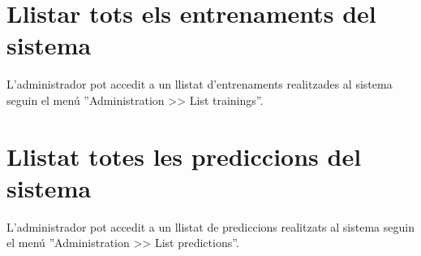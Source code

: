\section{Llistar tots els entrenaments del sistema}
L'administrador pot accedit a  un llistat d'entrenaments realitzades al sistema seguin el menú ''Administration >> List trainings''.

\section{Llistat totes les prediccions del sistema}
L'administrador pot accedit a  un llistat de prediccions realitzats al sistema seguin el menú ''Administration >> List predictions''.

